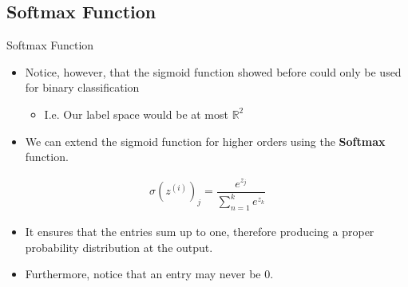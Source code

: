 \subsection{Softmax Function}
\begin{frame}{Softmax Function}
	\begin{itemize}
		\item Notice, however, that the sigmoid function showed before could only be used for binary classification
		      \begin{itemize}
		      	\item I.e. Our label space would be at most $\mathbb{R}^2$
		      \end{itemize}
		\item We can extend the sigmoid function for higher orders using the \textbf{Softmax} function.
	\end{itemize}
	\begin{gather*}
		\sigma(z^{(i)})_j = \dfrac{e^{z_j}}{\sum_{n=1}^{k} e^{z_k}}
	\end{gather*}
	\begin{itemize}
		\item It ensures that the entries sum up to one, therefore producing a proper probability distribution at the output.
		\item Furthermore, notice that an entry may never be 0.
	\end{itemize}
\end{frame}


